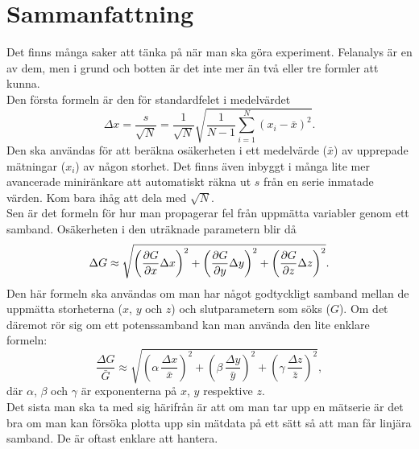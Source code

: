 \documentclass[11pt,a4paper, swedish
]{article}
\begin{document}
\newpage
\section{Sammanfattning}
Det finns många saker att tänka på när man ska göra
experiment. Felanalys är en av dem, men i grund och botten är det inte
mer än två eller tre formler att kunna. 
\\[16pt]
Den första formeln är den för standardfelet i medelvärdet
\[
\Delta{x} = \frac{s}{\sqrt{N}} 
= \frac{1}{\sqrt{N}}\sqrt{\frac{1}{N-1}\sum_{i=1}^N (x_i-\bar{x})^2}.
\]
Den ska användas för att beräkna osäkerheten i ett medelvärde
($\bar{x}$) av upprepade mätningar ($x_i$) av någon storhet. Det finns
även inbyggt i många lite mer avancerade miniränkare att automatiskt
räkna ut $s$ från en serie inmatade värden. Kom bara ihåg att dela med
$\sqrt{N}$. 
\\[16pt]
Sen är det formeln för hur man propagerar fel från uppmätta variabler
genom ett samband. Osäkerheten i den uträknade parametern blir då
\[
\Delta{G} \approx \sqrt{
\left(\pdv{G}{x}\Delta{x}\right)^2
+\left(\pdv{G}{y}\Delta{y}\right)^2
+\left(\pdv{G}{z}\Delta{z}\right)^2
}.
\]
Den här formeln ska användas om man har något godtyckligt samband
mellan de uppmätta storheterna ($x$, $y$ och $z$) och slutparametern
som söks ($G$). Om det däremot rör sig om ett potenssamband kan man
använda den lite enklare formeln:
\[
\frac{\Delta{G}}{\bar{G}} \approx \sqrt{
\left(\alpha\,\frac{\Delta{x}}{\bar{x}}\right)^2
+\left(\beta\,\frac{\Delta{y}}{\bar{y}}\right)^2
+\left(\gamma\,\frac{\Delta{z}}{\bar{z}}\right)^2
},
\]
där $\alpha$, $\beta$ och $\gamma$ är exponenterna på $x$, $y$
respektive $z$.
\\[16pt]
Det sista man ska ta med sig härifrån är att om man tar upp en
mätserie är det bra om man kan försöka plotta upp sin mätdata på ett
sätt så att man får linjära samband. De är oftast enklare att hantera. 




%
\clearpage
\appendix


\end{document}
